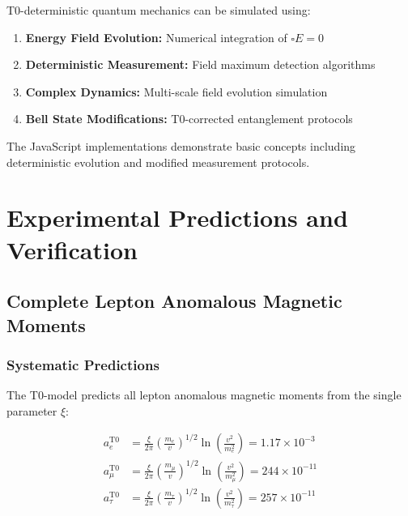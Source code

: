 \documentclass[12pt,a4paper]{article}
\theoremstyle{definition}
\begin{document}
T0-deterministic quantum mechanics can be simulated using:

\begin{enumerate}
	\item \textbf{Energy Field Evolution:} Numerical integration of $\square E = 0$
	\item \textbf{Deterministic Measurement:} Field maximum detection algorithms
	\item \textbf{Complex Dynamics:} Multi-scale field evolution simulation
	\item \textbf{Bell State Modifications:} T0-corrected entanglement protocols
\end{enumerate}

The JavaScript implementations demonstrate basic concepts including deterministic evolution and modified measurement protocols.


\section{Experimental Predictions and Verification}

\subsection{Complete Lepton Anomalous Magnetic Moments}

\subsubsection{Systematic Predictions}

The T0-model predicts all lepton anomalous magnetic moments from the single parameter $\xi$:

\begin{align}
	a_e^{\text{T0}} &= \frac{\xi}{2\pi} \left(\frac{m_e}{v}\right)^{1/2} \ln\left(\frac{v^2}{m_e^2}\right) = 1.17 \times 10^{-3} \\
	a_\mu^{\text{T0}} &= \frac{\xi}{2\pi} \left(\frac{m_\mu}{v}\right)^{1/2} \ln\left(\frac{v^2}{m_\mu^2}\right) = 244 \times 10^{-11} \\
	a_\tau^{\text{T0}} &= \frac{\xi}{2\pi} \left(\frac{m_\tau}{v}\right)^{1/2} \ln\left(\frac{v^2}{m_\tau^2}\right) = 257 \times 10^{-11}
\end{align}
\end{document}
